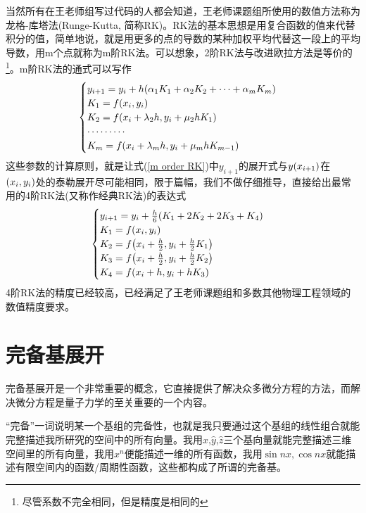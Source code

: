 \documentclass[12pt,a4paper,openany,twoside]{book}
\numberwithin{equation}{section}
\begin{document}
            当然所有在王老师组写过代码的人都会知道，王老师课题组所使用的数值方法称为龙格-库塔法(Runge-Kutta, 简称RK)。RK法的基本思想是用复合函数的值来代替积分的值，简单地说，就是用更多的点的导数的某种加权平均代替这一段上的平均导数，用m个点就称为m阶RK法。可以想象，2阶RK法与改进欧拉方法是等价的\footnote{尽管系数不完全相同，但是精度是相同的}。m阶RK法的通式可以写作
            \begin{equation}
              \begin{cases}
                y_{i+1}=y_i+h\qty(\alpha_1 K_1+\alpha_2 K_2+\cdots+\alpha_m K_m)\\
                K_1=f\qty(x_i, y_i)\\
                K_2=f\qty(x_i+\lambda_2 h, y_i+\mu_2 h K_1)\\
                \cdots\cdots\cdots\\
                K_m=f\qty(x_i+\lambda_m h, y_i+\mu_m h K_{m-1})
              \end{cases}
              \label{m order RK}
            \end{equation}
            这些参数的计算原则，就是让式(\ref{m order RK})中$y_{i+1}$的展开式与$y\qty(x_{i+1})$在$\qty(x_i,y_i)$处的泰勒展开尽可能相同，限于篇幅，我们不做仔细推导，直接给出最常用的4阶RK法(又称作经典RK法)的表达式
            \begin{equation}
              \begin{cases}
                y_{i+1}=y_i+\frac{h}{6}\qty(K_1+2K_2+2K_3+K_4)\\
                K_1=f\qty(x_i,y_i)\\
                K_2=f\qty(x_i+\frac{h}{2},y_i+\frac{h}{2}K_1) \\
                K_3=f\qty(x_i+\frac{h}{2},y_i+\frac{h}{2}K_2) \\
                K_4=f\qty(x_i+h, y_i+hK_3)
              \end{cases}
              \label{4 order RK}
            \end{equation}
            4阶RK法的精度已经较高，已经满足了王老师课题组和多数其他物理工程领域的数值精度要求。

        \section{完备基展开}
          完备基展开是一个非常重要的概念，它直接提供了解决众多微分方程的方法，而解决微分方程是量子力学的至关重要的一个内容。

          “完备”一词说明某一个基组的完备性，也就是我只要通过这个基组的线性组合就能完整描述我所研究的空间中的所有向量。我用$\hat{x}$,$\hat{y}$,$\hat{z}$三个基向量就能完整描述三维空间里的所有向量，我用${x^n}$便能描述一维的所有函数，我用${\sin{nx},\cos{nx}}$就能描述有限空间内的函数/周期性函数，这些都构成了所谓的完备基。
\end{document}
